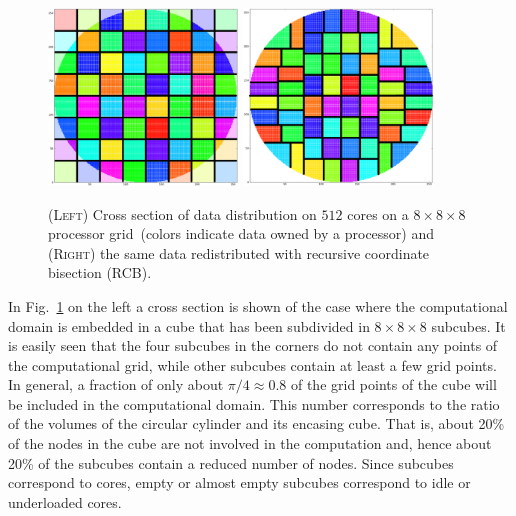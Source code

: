\documentclass[oribibl]{llncs}
\begin{document}
\begin{figure}[htb]
  \centering
  \includegraphics[width=0.45\textwidth]{plots/dist_1_rect.png}
  \hspace*{0.04\textwidth}
  \includegraphics[width=0.45\textwidth]{plots/dist_1.png}
  \caption{(\textsc{Left}) Cross section of data distribution on $512$
    cores on a $8\!\times\!8\!\times\!8$ processor grid~(colors indicate
    data owned by a processor) and (\textsc{Right}) the same data
    redistributed with recursive coordinate bisection (RCB).}
  \label{fig:domcomp}
\end{figure}
In Fig.~\ref{fig:domcomp} on the left a cross section is shown of the
case where the computational domain is embedded in a cube that has been
subdivided in $8\!\times\!8\!\times\!8$ subcubes.  It is easily seen
that the four subcubes in the corners do not contain any points of the
computational grid, while other subcubes contain at least a few grid
points.  In general, a fraction of only about $\pi/4\approx0.8$ of the
grid points of the cube will be included in the computational domain.
This number corresponds to the ratio of the volumes of the circular
cylinder and its encasing cube.  That is, about 20\% of the nodes in the
cube are not involved in the computation and, hence about 20\% of the
subcubes contain a reduced number of nodes.  Since subcubes correspond
to cores, empty or almost empty subcubes correspond to idle or
underloaded cores.
\end{document}
